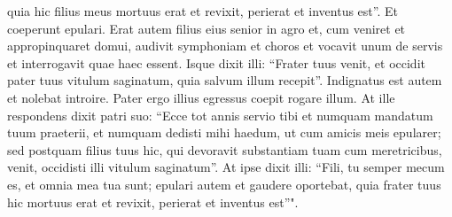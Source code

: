 \begin{biblechapter}
\verse quia hic filius meus mortuus erat et revixit, perierat et inventus est”. Et coeperunt epulari. 
\verse Erat autem filius eius senior in agro et, cum veniret et appropinquaret domui, audivit symphoniam et choros 
\verse et vocavit unum de servis et interrogavit quae haec essent. 
\verse Isque dixit illi: “Frater tuus venit, et occidit pater tuus vitulum saginatum, quia salvum illum recepit”. 
\verse Indignatus est autem et nolebat introire. Pater ergo illius egressus coepit rogare illum. 
\verse At ille respondens dixit patri suo: “Ecce tot annis servio tibi et numquam mandatum tuum praeterii, et numquam dedisti mihi haedum, ut cum amicis meis epularer; 
\verse sed postquam filius tuus hic, qui devoravit substantiam tuam cum meretricibus, venit, occidisti illi vitulum saginatum”. 
\verse At ipse dixit illi: “Fili, tu semper mecum es, et omnia mea tua sunt; 
\verse epulari autem et gaudere oportebat, quia frater tuus hic mortuus erat et revixit, perierat et inventus est”". 
\end{biblechapter}

